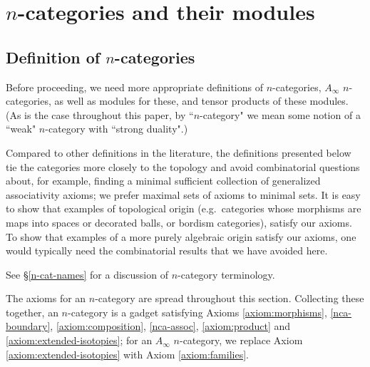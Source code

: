 
\def\xxpar#1#2{\smallskip\noindent{\bf #1} {\it #2} \smallskip}
\def\mmpar#1#2#3{\smallskip\noindent{\bf #1} (#2). {\it #3} \smallskip}

\section{\texorpdfstring{$n$}{n}-categories and their modules}
\label{sec:ncats}

\subsection{Definition of \texorpdfstring{$n$}{n}-categories}
\label{ss:n-cat-def}

Before proceeding, we need more appropriate definitions of $n$-categories, 
$A_\infty$ $n$-categories, as well as modules for these, and tensor products of these modules.
(As is the case throughout this paper, by ``$n$-category" we mean some notion of
a ``weak" $n$-category with ``strong duality".)

Compared to other definitions in the literature,
the definitions presented below tie the categories more closely to the topology
and avoid combinatorial questions about, for example, finding a minimal sufficient
collection of generalized associativity axioms; we prefer maximal sets of axioms to minimal sets.
It is easy to show that examples of topological origin
(e.g.\ categories whose morphisms are maps into spaces or decorated balls, or bordism categories), 
satisfy our axioms.
To show that examples of a more purely algebraic origin satisfy our axioms, 
one would typically need the combinatorial
results that we have avoided here.

See \S\ref{n-cat-names} for a discussion of $n$-category terminology.


\medskip

The axioms for an $n$-category are spread throughout this section.
Collecting these together, an $n$-category is a gadget satisfying Axioms \ref{axiom:morphisms}, 
\ref{nca-boundary}, \ref{axiom:composition},  \ref{nca-assoc}, \ref{axiom:product} and 
\ref{axiom:extended-isotopies}; for an $A_\infty$ $n$-category, we replace 
Axiom \ref{axiom:extended-isotopies} with Axiom \ref{axiom:families}.


